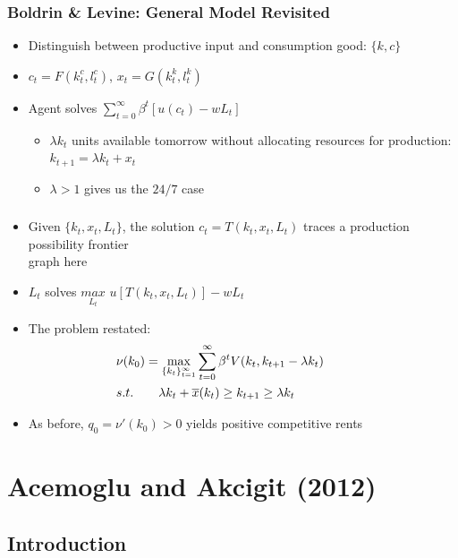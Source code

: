 \documentclass{beamer}
\begin{document}
\begin{frame}
  \frametitle{Boldrin \& Levine: General Model Revisited}
  \begin{itemize}
    \item<+-> Distinguish between productive input and consumption good: $\{k,c\}$
    \item<+-> $c_t = F(k_t^c,l_t^c)$, $x_t = G(k_t^k,l_t^k)$
    \item<+-> Agent solves $\sum_{t=0}^\infty\beta^t[u(c_t)-wL_t]$
    \begin{itemize}
      \item<+-> $\lambda k_t$ units available tomorrow without allocating resources for production: $k_{t+1} = \lambda k_t + x_t$
      \item<+-> $\lambda > 1$ gives us the $24/7$ case
    \end{itemize}
  \end{itemize}
\end{frame}

\begin{frame}
  \frametitle{}
  \begin{itemize}
    \item<+-> Given $\{k_t, x_t, L_t\}$, the solution $c_t = T(k_t,x_t,L_t)$ traces a      production possibility frontier\\
     graph here
  \item<+-> $L_t$ solves $\underset{L_t}{max}$ $u[T(k_t,x_t,L_t)]-wL_t$
  \item<+-> The problem restated:
  \begin{align*}
    &\nu(k_0)=
    \max_{\{k_t\}_{t=1}^\infty} \sum_{t=0}^\infty\beta^tV(k_t,k_{t+1} - \lambda k_t)
      \hspace{13mm}\\
    &s.t. \ \ \ \ \ \ \lambda k_t + \overline{x}(k_t) \ge k_{t+1} \ge \lambda k_t
  \end{align*}
  \item<+-> As before, $q_0 = \nu ' (k_0) > 0$ yields positive competitive rents
  \end{itemize} 
\end{frame}

\section{Acemoglu and Akcigit (2012)}
\label{sec:acemoglu_and_akcigit_2012}

\subsection{Introduction}
\label{sub:introduction}
\end{document}
